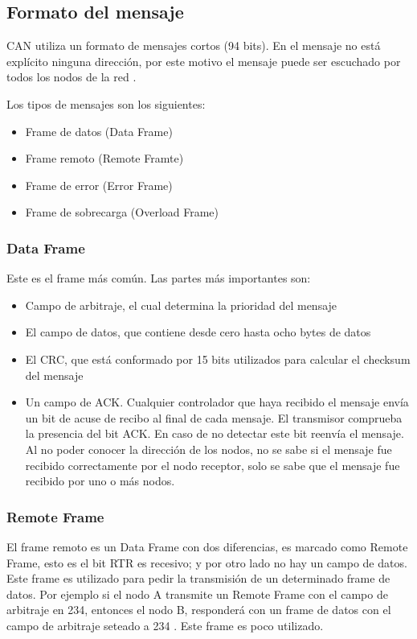 \subsection{Formato del mensaje}
CAN utiliza un formato de mensajes cortos (94 bits). En el mensaje no está explícito ninguna dirección, por este motivo el mensaje puede ser escuchado por todos los nodos de la red \citep{kvaserWEB}.

Los tipos de mensajes son los siguientes:
\begin{itemize}
    \item Frame de datos (Data Frame)
    \item Frame remoto (Remote Framte)
    \item Frame de error (Error Frame)
    \item Frame de sobrecarga (Overload Frame)
\end{itemize}

\subsubsection{Data Frame}
Este es el frame más común. Las partes más importantes son:

\begin{itemize}
\item Campo de arbitraje, el cual determina la prioridad del mensaje
\item El campo de datos, que contiene desde cero hasta ocho bytes de datos
\item El CRC, que está conformado por 15 bits utilizados para calcular el checksum del mensaje
\item Un campo de ACK. Cualquier controlador que haya recibido el mensaje envía un bit de acuse de recibo al final de cada mensaje. El transmisor comprueba la presencia del bit ACK. En caso de no detectar este bit reenvía el mensaje. Al no poder conocer la dirección de los nodos, no se sabe si el mensaje fue recibido correctamente por el nodo receptor, solo se sabe que el mensaje fue recibido por uno o más nodos.
\end{itemize}

\subsubsection{Remote Frame}
El frame remoto es un Data Frame con dos diferencias, es marcado como Remote Frame, esto es el bit RTR es recesivo; y por otro lado no hay un campo de datos. Este frame es utilizado para pedir la transmisión de un determinado frame de datos. Por ejemplo si el nodo A transmite un Remote Frame con el campo de arbitraje en 234, entonces el nodo B, responderá con un frame de datos con el campo de arbitraje seteado a 234 \citep{kvaserWEB}. Este frame es poco utilizado.

